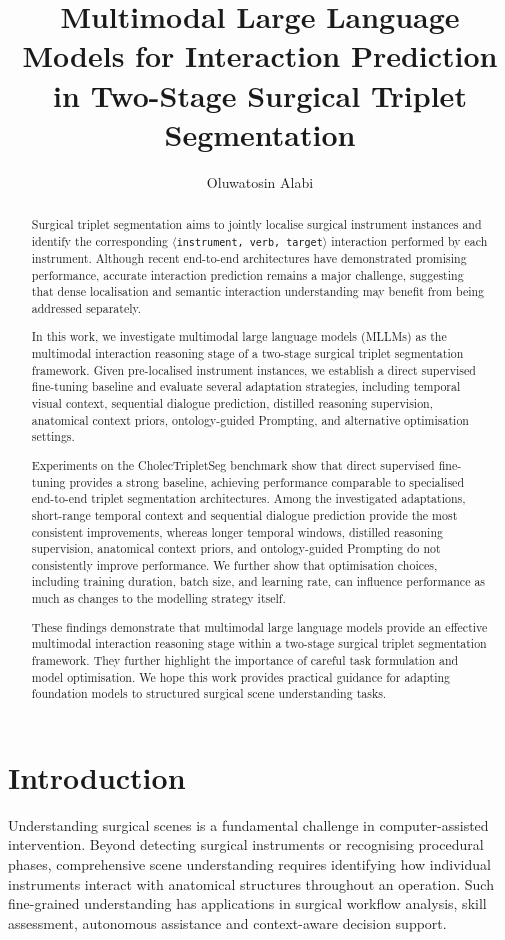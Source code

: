 \documentclass[11pt]{article}
\title{Multimodal Large Language Models for Interaction Prediction in Two-Stage Surgical Triplet Segmentation}
\author{Oluwatosin Alabi}
\date{}
\newcommand{\ivttriplet}{\texttt{$\langle$instrument, verb, target$\rangle$}\xspace}
\begin{document}
\maketitle

\begin{abstract} 
Surgical triplet segmentation aims to jointly localise surgical instrument instances and identify the corresponding \ivttriplet interaction performed by each instrument. Although recent end-to-end architectures have demonstrated promising performance, accurate interaction prediction remains a major challenge, suggesting that dense localisation and semantic interaction understanding may benefit from being addressed separately.

In this work, we investigate multimodal large language models (MLLMs) as the multimodal interaction reasoning stage of a two-stage surgical triplet segmentation framework. Given pre-localised instrument instances, we establish a direct supervised fine-tuning baseline and evaluate several adaptation strategies, including temporal visual context, sequential dialogue prediction, distilled reasoning supervision, anatomical context priors, ontology-guided Prompting, and alternative optimisation settings.

Experiments on the CholecTripletSeg benchmark show that direct supervised fine-tuning provides a strong baseline, achieving performance comparable to specialised end-to-end triplet segmentation architectures. Among the investigated adaptations, short-range temporal context and sequential dialogue prediction provide the most consistent improvements, whereas longer temporal windows, distilled reasoning supervision, anatomical context priors, and ontology-guided Prompting do not consistently improve performance. We further show that optimisation choices, including training duration, batch size, and learning rate, can influence performance as much as changes to the modelling strategy itself.

These findings demonstrate that multimodal large language models provide an effective multimodal interaction reasoning stage within a two-stage surgical triplet segmentation framework. They further highlight the importance of careful task formulation and model optimisation. We hope this work provides practical guidance for adapting foundation models to structured surgical scene understanding tasks.
\end{abstract}

\section{Introduction}
Understanding surgical scenes is a fundamental challenge in computer-assisted intervention. Beyond detecting surgical instruments or recognising procedural phases, comprehensive scene understanding requires identifying how individual instruments interact with anatomical structures throughout an operation. Such fine-grained understanding has applications in surgical workflow analysis, skill assessment, autonomous assistance and context-aware decision support.
\end{document}
